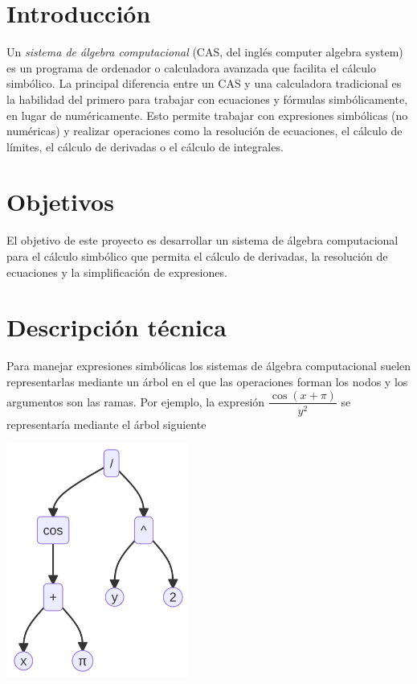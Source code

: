 \documentclass[
  a4paper,
]{scrreport}
\begin{document}
\section{Introducción}\label{introducciuxf3n}

Un \emph{sistema de álgebra computacional} (CAS, del inglés computer
algebra system) es un programa de ordenador o calculadora avanzada que
facilita el cálculo simbólico. La principal diferencia entre un CAS y
una calculadora tradicional es la habilidad del primero para trabajar
con ecuaciones y fórmulas simbólicamente, en lugar de numéricamente.
Esto permite trabajar con expresiones simbólicas (no numéricas) y
realizar operaciones como la resolución de ecuaciones, el cálculo de
límites, el cálculo de derivadas o el cálculo de integrales.

\section{Objetivos}\label{objetivos}

El objetivo de este proyecto es desarrollar un sistema de álgebra
computacional para el cálculo simbólico que permita el cálculo de
derivadas, la resolución de ecuaciones y la simplificación de
expresiones.

\section{Descripción técnica}\label{descripciuxf3n-tuxe9cnica}

Para manejar expresiones simbólicas los sistemas de álgebra
computacional suelen representarlas mediante un árbol en el que las
operaciones forman los nodos y los argumentos son las ramas. Por
ejemplo, la expresión \(\dfrac{\cos(x+\pi)}{y^2}\) se representaría
mediante el árbol siguiente

\label{arbol-expresion}
\includegraphics[width=2.37in,height=3.03in]{calculo-simbolico_files/figure-latex/mermaid-figure-1.png}
\end{document}
